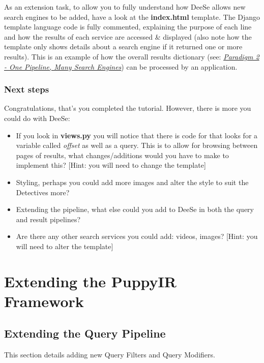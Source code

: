 \documentclass[letterpaper,10pt,english]{sphinxmanual}
\begin{document}
As an extension task, to allow you to fully understand how DeeSe allows new search engines to be added, have a look at the \textbf{index.html} template. The Django template language code is fully commented, explaining the purpose of each line and how the results of each service are accessed \& displayed (also note how the template only shows details about a search engine if it returned one or more results). This is an example of how the overall results dictionary (see: {\hyperref[pipeline:pipeline-architecture]{\emph{Paradigm 2 - One Pipeline, Many Search Engines}}}) can be processed by an application.


\subsection{Next steps}
\label{pipeline-tutorial:next-steps}
Congratulations, that's you completed the tutorial. However, there is more you could do with DeeSe:
\begin{itemize}
\item {} 
If you look in \textbf{views.py} you will notice that there is code for that looks for a variable called \emph{offset} as well as a query. This is to allow for browsing between pages of results, what changes/additions would you have to make to implement this? {[}Hint: you will need to change the template{]}

\item {} 
Styling, perhaps you could add more images and alter the style to suit the Detectives more?

\item {} 
Extending the pipeline, what else could you add to DeeSe in both the query and result pipelines?

\item {} 
Are there any other search services you could add: videos, images? {[}Hint: you will need to alter the template{]}

\end{itemize}


\chapter{Extending the PuppyIR Framework}
\label{index:extending-the-puppyir-framework}

\section{Extending the Query Pipeline}
\label{extendingQuery:extending-the-query-pipeline}\label{extendingQuery::doc}\label{extendingQuery:id1}
This section details adding new Query Filters and Query Modifiers.
\end{document}

